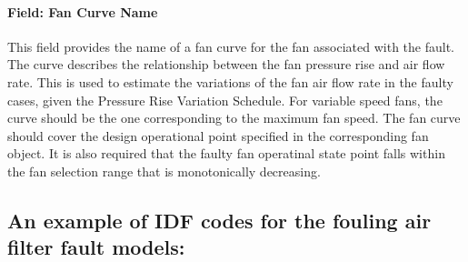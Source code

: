\paragraph{Field: Fan Curve Name}\label{field-fan-curve-name}

This field provides the name of a fan curve for the fan associated with the fault. The curve describes the relationship between the fan pressure rise and air flow rate. This is used to estimate the variations of the fan air flow rate in the faulty cases, given the Pressure Rise Variation Schedule. For variable speed fans, the curve should be the one corresponding to the maximum fan speed. The fan curve should cover the design operational point specified in the corresponding fan object. It is also required that the faulty fan operatinal state point falls within the fan selection range that is monotonically decreasing.

\subsection{An example of IDF codes for the fouling air filter fault models:}\label{an-example-of-idf-codes-for-the-fouling-air-filter-fault-models}

